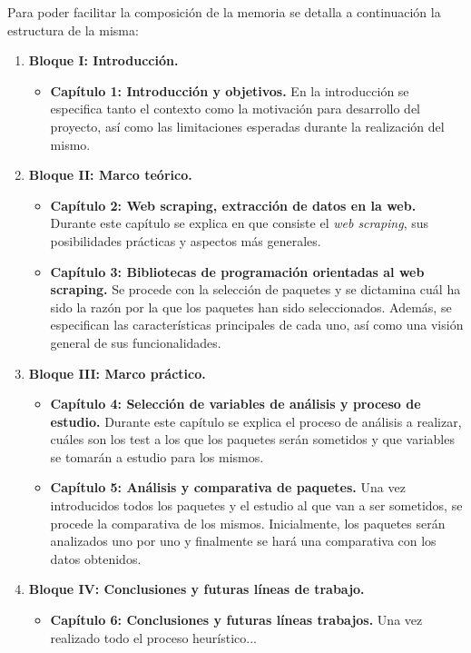 Para poder facilitar la composición de la memoria se detalla a continuación la estructura de la misma:
\begin{enumerate}
  \item {\bfseries Bloque I: Introducción. }
        \begin{itemize}
          \item {\bfseries Capítulo 1: Introducción y objetivos. \justify}
                En la introducción se especifica tanto el contexto como la motivación para desarrollo del 
                proyecto, así como las limitaciones esperadas durante la realización del mismo.
        \end{itemize}
  \item {\bfseries Bloque II: Marco teórico. }
        \begin{itemize}
          \item {\bfseries Capítulo 2: Web scraping, extracción de datos en la web. \justify}
                Durante este capítulo se explica en que consiste el \emph{web scraping}, sus posibilidades 
                prácticas y aspectos más generales.
          \item {\bfseries Capítulo 3: Bibliotecas de programación orientadas al web scraping. \justify}
                Se procede con la selección de paquetes y se dictamina cuál ha sido la razón por la que los 
                paquetes han sido seleccionados. Además, se especifican las características principales 
                de cada uno, así como una visión general de sus funcionalidades.
        \end{itemize}
  \item {\bfseries Bloque III: Marco práctico. }
        \begin{itemize}
          \item {\bfseries Capítulo 4: Selección de variables de análisis y proceso de estudio. \justify}
                Durante este capítulo se explica el proceso de análisis a realizar, cuáles son los test 
                a los que los paquetes serán sometidos y que variables se tomarán a estudio para los mismos.
          \item {\bfseries Capítulo 5: Análisis y comparativa de paquetes. \justify}
                Una vez introducidos todos los paquetes y el estudio al que van a ser sometidos, se procede 
                la comparativa de los mismos. Inicialmente, los paquetes serán analizados uno por uno y 
                finalmente se hará una comparativa con los datos obtenidos.
        \end{itemize}
  \item {\bfseries Bloque IV: Conclusiones y futuras líneas de trabajo. }
        \begin{itemize}
      \item {\bfseries Capítulo 6: Conclusiones y futuras líneas trabajos. \justify}
            Una vez realizado todo el proceso heurístico...
        \end{itemize}
\end{enumerate}

